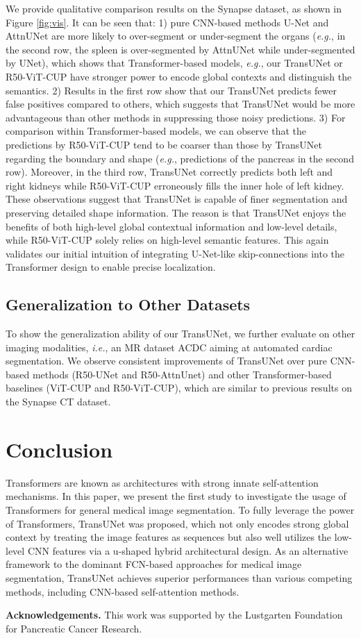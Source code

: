 \documentclass[runningheads]{llncs}
\begin{document}
We provide qualitative comparison results on the Synapse dataset, as shown in Figure \ref{fig:vis}. It can be seen that: 1) pure CNN-based methods U-Net and AttnUNet are more likely to over-segment or under-segment the organs (\emph{e.g.}, in the second row, the spleen is over-segmented by AttnUNet while under-segmented by UNet), which shows that Transformer-based models, \emph{e.g.}, our TransUNet or R50-ViT-CUP have stronger power to encode global contexts and distinguish the semantics. 2) Results in the first row show that our TransUNet predicts fewer false positives compared to others, which suggests that TransUNet would be more advantageous than other methods in suppressing those noisy predictions. 3) For comparison within Transformer-based models, we can observe that the predictions by R50-ViT-CUP tend to be coarser than those by TransUNet regarding the boundary and shape (\emph{e.g.}, predictions of the pancreas in the second row). Moreover, in the third row, TransUNet correctly predicts both left and right kidneys while R50-ViT-CUP erroneously fills the inner hole of left kidney. These observations suggest that TransUNet is capable of finer segmentation and preserving detailed shape information. 
The reason is that TransUNet enjoys the benefits of both high-level global contextual information and low-level details,
while R50-ViT-CUP solely relies on high-level semantic features. 
This again validates our initial intuition of integrating U-Net-like skip-connections into the Transformer design to enable precise localization.

\subsection{Generalization to Other Datasets}

To show the generalization ability of our TransUNet, we further evaluate on other imaging modalities, \emph{i.e.}, an MR dataset ACDC aiming at automated cardiac segmentation. We observe consistent improvements of TransUNet over pure CNN-based methods (R50-UNet and R50-AttnUnet) and other Transformer-based baselines (ViT-CUP and R50-ViT-CUP), which are similar to previous results on the Synapse CT dataset.

\section{Conclusion}
Transformers are known as architectures with strong innate self-attention mechanisms.
In this paper, we present the first study to investigate the usage of Transformers for general medical image segmentation. 
To fully leverage the power of Transformers, TransUNet was proposed, which not only encodes strong global context by treating the image features as sequences but also well utilizes the low-level CNN features via a u-shaped hybrid architectural design.
As an alternative framework to the dominant FCN-based approaches for medical image segmentation, TransUNet achieves superior performances than various competing methods, including CNN-based self-attention methods.

\noindent\textbf{Acknowledgements.} This work was supported by the Lustgarten Foundation for Pancreatic Cancer Research.




{\small

}
\end{document}
